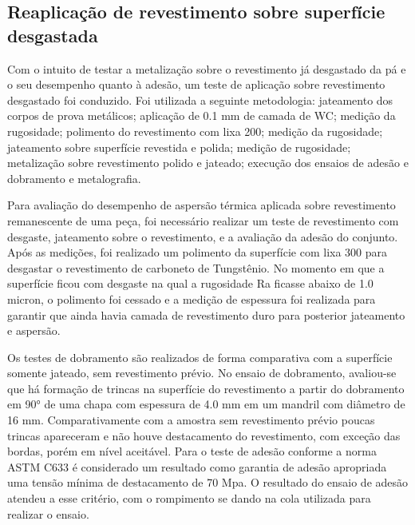 \subsection{Reaplicação de revestimento sobre superfície desgastada}
Com o intuito de testar a metalização sobre o revestimento já desgastado da pá
e o seu desempenho quanto à adesão, um teste de aplicação sobre revestimento
desgastado foi conduzido. Foi utilizada a seguinte metodologia: jateamento dos
corpos de prova metálicos; aplicação de 0.1 mm de camada de WC; medição da
rugosidade; polimento do revestimento com lixa 200; medição da rugosidade; jateamento
sobre superfície revestida e polida; medição de rugosidade; metalização sobre
revestimento polido e jateado; execução dos ensaios de adesão e dobramento e
metalografia.

Para avaliação do desempenho de aspersão térmica aplicada sobre revestimento
remanescente de uma peça, foi necessário realizar um teste de revestimento com
desgaste, jateamento sobre o revestimento, e a avaliação da adesão do conjunto.
Após as medições, foi realizado um polimento da superfície com lixa 300 para
desgastar o revestimento de carboneto de Tungstênio. No momento em que a
superfície ficou com desgaste na qual a rugosidade Ra ficasse abaixo de 1.0
micron, o polimento foi cessado e a medição de espessura foi realizada para
garantir que ainda havia camada de revestimento duro para posterior jateamento
e aspersão. 

Os testes de dobramento são realizados de forma comparativa com a
superfície somente jateado, sem revestimento prévio. No ensaio de dobramento,
avaliou-se que há formação de trincas na superfície do revestimento a partir
do dobramento em 90° de uma chapa com espessura de 4.0 mm em um mandril com
diâmetro de 16 mm. Comparativamente com a amostra sem revestimento prévio
poucas trincas apareceram e não houve destacamento do revestimento, com exceção
das bordas, porém em nível aceitável. Para o teste de adesão conforme a norma
ASTM C633 é considerado um resultado como garantia de adesão apropriada uma
tensão mínima de destacamento de 70 Mpa. O resultado do ensaio de adesão
atendeu a esse critério, com o rompimento se dando na cola utilizada para
realizar o ensaio.